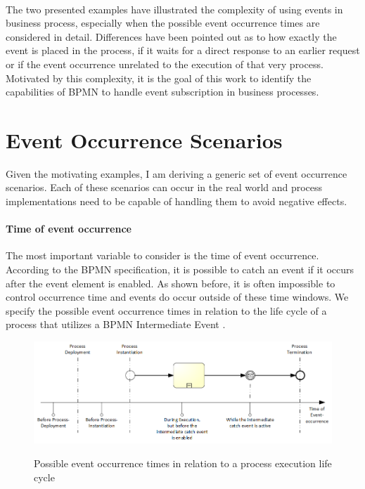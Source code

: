 
\paragraph{}
\noindent
The two presented examples have illustrated the complexity of using events in business process, especially when the possible event occurrence times are considered in detail.
Differences have been pointed out as to how exactly the event is placed in the process, if it waits for a direct response to an earlier request or if the event occurrence unrelated to the execution of that very process.
Motivated by this complexity, it is the goal of this work to identify the capabilities of BPMN to handle event subscription in business processes.



\section{Event Occurrence Scenarios}
Given the motivating examples, I am deriving a generic set of event occurrence scenarios. Each of these scenarios can occur in the real world and process implementations need to be capable of handling them to avoid negative effects.

\paragraph{Time of event occurrence}

The most important variable to consider is the time of event occurrence. According to the BPMN specification, it is possible to catch an event if it occurs after the event element is enabled. As shown before, it is often impossible to control occurrence time and events do occur outside of these time windows.
We specify the possible event occurrence times in relation to the life cycle of a process that utilizes a BPMN Intermediate Event .
\begin{figure}[]
	\myfloatalign
	{\includegraphics[width=1\linewidth]{chapters/requirements/timeline-event-occurrence.png}}
	\caption{Possible event occurrence times in relation to a process execution life cycle}\label{fig:occurrence-timeline}
\end{figure}

